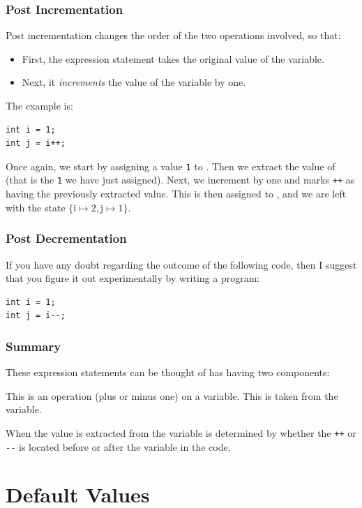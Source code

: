 \subsubsection{Post Incrementation}

Post incrementation changes the order of the two operations involved, so that:
\begin{itemize}
    \item First, the expression statement takes the original value of the variable.
    \item Next, it \textsl{increments} the value of the variable by one.
\end{itemize}
The example is:
\begin{verbatim}
int i = 1;
int j = i++;
\end{verbatim}
Once again, we start by assigning a value \texttt{1} to . Then we extract the value of  (that is the \texttt{1} we have just assigned). Next, we increment  by one and marks \texttt{++} as having the previously extracted value. This is then assigned to , and we are left with the state $\{\mathrm{i} \mapsto 2, \mathrm{j} \mapsto 1\}$.

\subsubsection{Post Decrementation}

If you have any doubt regarding the outcome of the following code, then I suggest that you figure it out experimentally by writing a program:
\begin{verbatim}
int i = 1;
int j = i--;
\end{verbatim}

\subsubsection{Summary}

These expression statements can be thought of has having two components:
\begin{itemize}
     This is an operation (plus or minus one) on a variable.
     This is taken from the variable.
\end{itemize}
When the value is extracted from the variable is determined by whether the \texttt{++} or \texttt{-{}-} is located before or after the variable in the code.

\section{Default Values}

